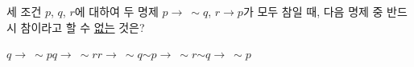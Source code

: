 세 조건 $p$, $q$, $r$에 대하여 두 명제 $p\longrightarrow\ \sim q$, $r\longrightarrow p$가 모두 참일 때, 다음 명제 중 반드시 참이라고 할 수 \underline{없는} 것은?
\begin{choices32}{$q\longrightarrow\ \sim p$}{$q\longrightarrow\ \sim r$}{$r\longrightarrow\ \sim q$}{$\sim p\longrightarrow\ \sim r$}{$\sim q\longrightarrow\ \sim p$}\end{choices32}
